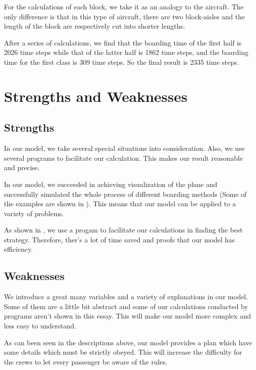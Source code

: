 \documentclass{article}
\theoremstyle{definition}
\theoremstyle{remark}
\numberwithin{equation}{section}
\begin{document}
	For the calculations of each block, we take it as an analogy to the  aircraft. The only difference is that in this type of aircraft, there are two block-aisles and the length of the block are respectively cut into shorter lengths.

	After a series of calculations, we find that the boarding time of the first half is 2026 time steps while that of the latter half is 1862 time steps, and the boarding time for the first class is 309 time steps. So the final result is 2335 time steps.
	\section{Strengths and Weaknesses}
	\subsection*{Strengths}
	\begin{itemize}

		In our model, we take several special situations into consideration. Also, we use several programs to facilitate our calculation. This makes our result reasonable and precise.

		In our model, we succeeded in achieving visualization of the plane and successfully simulated the whole process of different boarding methods (Some of the examples are shown in ). This means that our model can be applied to a variety of problems.

		As shown in , we use a progam to facilitate our calculations in finding the best strategy. Therefore, ther's a lot of time saved and proofs that our model has efficiency.
	\end{itemize}
	\subsection*{Weaknesses}
	\begin{itemize}
		\itembf{Complexity}

		We introduce a great many variables and a variety of explanations in our model. Some of them are a little bit abstract and some of our calculations conducted by programs aren't shown in this essay. This will make our model more complex and less easy to understand.
		\itembf{Difficulty to operate}

		As can been seen in the descriptions above, our model provides a plan which have some details which must be strictly obeyed. This will increase the difficulty for the crews to let every passenger be aware of the rules.
	\end{itemize}
\end{document}
